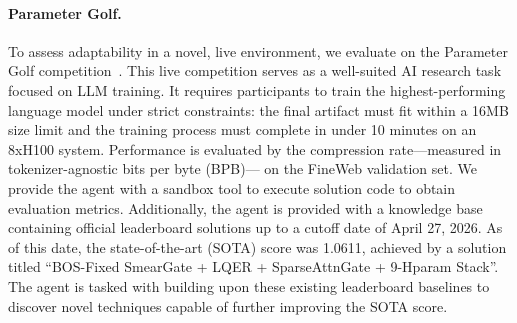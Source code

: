 \paragraph{Parameter Golf.} To assess adaptability in a novel, live environment, we evaluate \sys{} on the Parameter Golf competition~\citep{openai2026parametergolf}. This live competition serves as a well-suited AI research task focused on LLM training. It requires participants to train the highest-performing language model under strict constraints: the final artifact must fit within a 16MB size limit and the training process must complete in under 10 minutes on an 8xH100 system. Performance is evaluated by the compression rate---measured in tokenizer-agnostic bits per byte (BPB)--- on the FineWeb validation set. We provide the agent with a sandbox tool to execute solution code to obtain evaluation metrics. Additionally, the agent is provided with a knowledge base containing official leaderboard solutions up to a cutoff date of April 27, 2026. As of this date, the state-of-the-art (SOTA) score was 1.0611, achieved by a solution titled ``BOS-Fixed SmearGate + LQER + SparseAttnGate + 9-Hparam Stack''. The agent is tasked with building upon these existing leaderboard baselines to discover novel techniques capable of further improving the SOTA score.